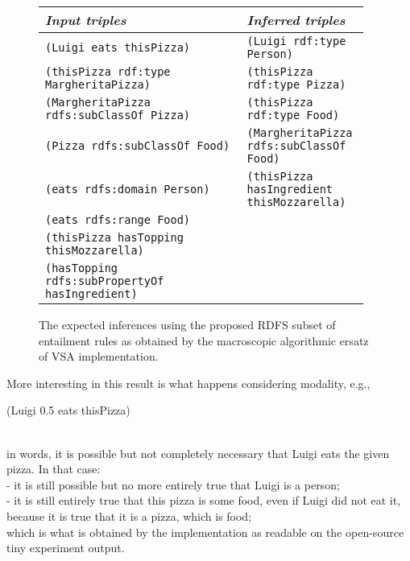 \documentclass[sn-mathphys]{sn-jnl}
\begin{document}
\begin{figure}[htb]
\begin{center}\begin{tabular}{| p{0.60\linewidth} | p{0.35\linewidth} |}
    {\em Input triples}                            & {\em Inferred triples} \\
\hline
  {\small\tt (Luigi eats thisPizza)}                      & {\small\tt (Luigi rdf:type Person)} \\
  {\small\tt (thisPizza rdf:type MargheritaPizza)}        & {\small\tt (thisPizza rdf:type Pizza)} \\
  {\small\tt (MargheritaPizza rdfs:subClassOf Pizza)}      & {\small\tt (thisPizza rdf:type Food)} \\
  {\small\tt (Pizza rdfs:subClassOf Food)}                & {\small\tt (MargheritaPizza rdfs:subClassOf Food)} \\
  {\small\tt (eats rdfs:domain Person)}                   &  {\small\tt (thisPizza hasIngredient thisMozzarella)}\\
  {\small\tt (eats rdfs:range Food)}                      &\\
  {\small\tt (thisPizza hasTopping thisMozzarella)}       &\\
  {\small\tt (hasTopping rdfs:subPropertyOf hasIngredient)} &\\
  \hline \end{tabular}\end{center}
\caption{The expected inferences using the proposed RDFS subset of entailment rules as obtained by
  the macroscopic algorithmic ersatz of VSA implementation.}
\label{result0}
\end{figure}

More interesting in this result is what happens considering modality, e.g.,
\\\centerline{(Luigi 0.5 eats thisPizza)}\\
in words, it is possible but not completely necessary that Luigi eats the given pizza. In that case:
\\- it is still possible but no more entirely true that Luigi is a person;
\\- it is still entirely true that this pizza is some food, even if Luigi did not eat it, because it is true that it is a pizza, which is food;
\\ which is what is obtained by the implementation as readable on the open-source tiny experiment output.
\end{document}
